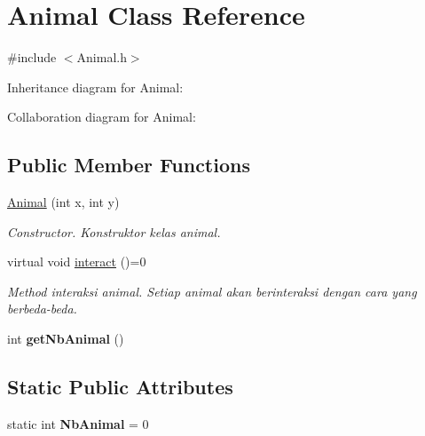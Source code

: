 \hypertarget{classAnimal}{}\section{Animal Class Reference}
\label{classAnimal}


{\ttfamily \#include $<$Animal.\+h$>$}



Inheritance diagram for Animal\+:


Collaboration diagram for Animal\+:
\subsection*{Public Member Functions}
\begin{DoxyCompactItemize}
\item 
\hyperlink{classAnimal_afbe79dbef20d061dbb0ded415b97b411}{Animal} (int x, int y)\hypertarget{classAnimal_afbe79dbef20d061dbb0ded415b97b411}{}\label{classAnimal_afbe79dbef20d061dbb0ded415b97b411}

\begin{DoxyCompactList}\small\item\em Constructor. Konstruktor kelas animal. \end{DoxyCompactList}\item 
virtual void \hyperlink{classAnimal_af47626b050b665e9a19525227d2b840f}{interact} ()=0\hypertarget{classAnimal_af47626b050b665e9a19525227d2b840f}{}\label{classAnimal_af47626b050b665e9a19525227d2b840f}

\begin{DoxyCompactList}\small\item\em Method interaksi animal. Setiap animal akan berinteraksi dengan cara yang berbeda-\/beda. \end{DoxyCompactList}\item 
int {\bfseries get\+Nb\+Animal} ()\hypertarget{classAnimal_a654785ec6e23f33780711446eff77c81}{}\label{classAnimal_a654785ec6e23f33780711446eff77c81}

\end{DoxyCompactItemize}
\subsection*{Static Public Attributes}
\begin{DoxyCompactItemize}
\item 
static int {\bfseries Nb\+Animal} = 0\hypertarget{classAnimal_a828b89505d3cf5fee0e3042332a81e6e}{}\label{classAnimal_a828b89505d3cf5fee0e3042332a81e6e}

\end{DoxyCompactItemize}
